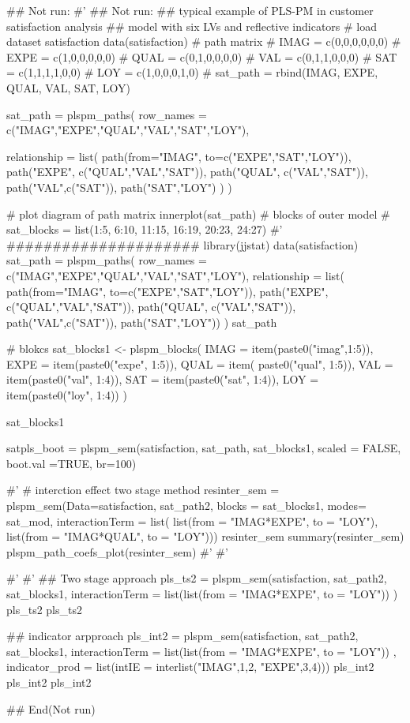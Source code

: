 \documentclass[a4paper]{book}
\begin{document}
\begin{Examples}
\begin{ExampleCode}


## Not run: 
#'
## Not run:
## typical example of PLS-PM in customer satisfaction analysis
## model with six LVs and reflective indicators
# load dataset satisfaction
data(satisfaction)
# path matrix
# IMAG = c(0,0,0,0,0,0)
# EXPE = c(1,0,0,0,0,0)
# QUAL = c(0,1,0,0,0,0)
# VAL = c(0,1,1,0,0,0)
# SAT = c(1,1,1,1,0,0)
# LOY = c(1,0,0,0,1,0)
# sat_path = rbind(IMAG, EXPE, QUAL, VAL, SAT, LOY)

sat_path = plspm_paths(
  row_names = c("IMAG","EXPE","QUAL","VAL","SAT","LOY"),

  relationship = list(
    path(from="IMAG", to=c("EXPE","SAT","LOY")),
    path("EXPE", c("QUAL","VAL","SAT")),
    path("QUAL", c("VAL","SAT")),
    path("VAL",c("SAT")),
    path("SAT","LOY")
  )
)

# plot diagram of path matrix
innerplot(sat_path)
# blocks of outer model
# sat_blocks = list(1:5, 6:10, 11:15, 16:19, 20:23, 24:27)
#' #####################
library(jjstat)
data(satisfaction)
sat_path = plspm_paths(
  row_names = c("IMAG","EXPE","QUAL","VAL","SAT","LOY"),
  relationship = list(
    path(from="IMAG", to=c("EXPE","SAT","LOY")),
    path("EXPE", c("QUAL","VAL","SAT")),
    path("QUAL", c("VAL","SAT")),
    path("VAL",c("SAT")),
    path("SAT","LOY"))
)
sat_path

# blokcs
sat_blocks1 <- plspm_blocks(
  IMAG = item(paste0("imag",1:5)),
  EXPE = item(paste0("expe", 1:5)),
  QUAL = item( paste0("qual", 1:5)),
  VAL = item(paste0("val", 1:4)),
  SAT = item(paste0("sat", 1:4)),
  LOY = item(paste0("loy", 1:4))
)

sat_blocks1

satpls_boot = plspm_sem(satisfaction, sat_path, sat_blocks1, scaled = FALSE,
                        boot.val =TRUE, br=100)


#'
# interction effect two stage method
resinter_sem = plspm_sem(Data=satisfaction,
                         sat_path2, blocks = sat_blocks1, modes= sat_mod,
                         interactionTerm = list(
                           list(from = "IMAG*EXPE", to = "LOY"),
                           list(from = "IMAG*QUAL", to = "LOY")))
resinter_sem
summary(resinter_sem)
plspm_path_coefs_plot(resinter_sem)
#'
#'



#'
#'
## Two stage approach
pls_ts2 = plspm_sem(satisfaction, sat_path2, sat_blocks1,
                    interactionTerm = list(list(from = "IMAG*EXPE", to = "LOY")) )
pls_ts2 %
pls_ts2 %

## indicator arpproach
pls_int2 = plspm_sem(satisfaction, sat_path2, sat_blocks1,
                     interactionTerm = list(list(from = "IMAG*EXPE", to = "LOY")) ,
                     indicator_prod = list(intIE = interlist("IMAG",1,2, "EXPE",3,4)))
pls_int2 %
pls_int2 %
pls_int2 %


## End(Not run)

\end{ExampleCode}
\end{Examples}
\end{document}
